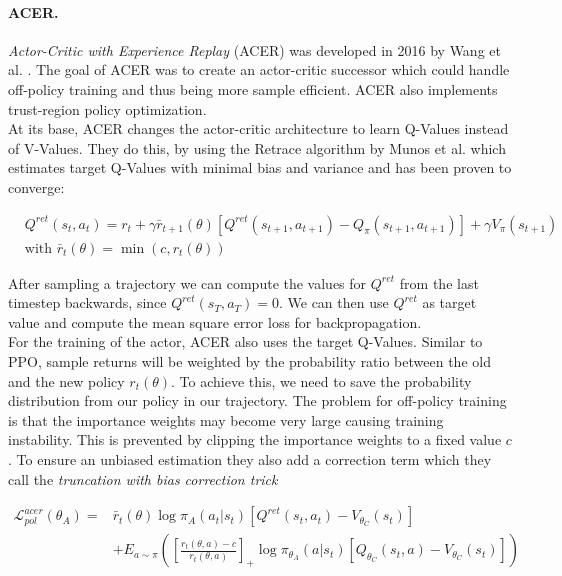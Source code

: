 \paragraph{ACER.}
\textit{Actor-Critic with Experience Replay} (ACER) was developed in 2016 by Wang et al. \cite{wang2016sample}. The goal of ACER was to create an actor-critic successor which could handle off-policy training and thus being more sample efficient. ACER also implements trust-region policy optimization. \\
At its base, ACER changes the actor-critic architecture to learn Q-Values instead of V-Values. They do this, by using the Retrace algorithm by Munos et al. \cite{munos2016safe} which estimates target Q-Values with minimal bias and variance and has been proven to converge:

\begin{align*}
  &Q^{ret}(s_t, a_t) = r_t + \gamma \bar{r}_{t+1}(\theta) \left[Q^{ret}(s_{t+1}, a_{t+1}) - Q_\pi(s_{t+1}, a_{t+1})\right] + \gamma V_\pi(s_{t+1}) \\
  &\text{with } \bar{r}_t(\theta) = \min(c, r_t(\theta))
\end{align*}

After sampling a trajectory we can compute the values for $Q^{ret}$ from the last timestep backwards, since $Q^{ret}(s_T, a_T) = 0$. We can then use $Q^{ret}$ as target value and compute the mean square error loss for backpropagation. \\
For the training of the actor, ACER also uses the target Q-Values. Similar to PPO, sample returns will be weighted by the probability ratio between the old and the new policy $r_t(\theta)$. To achieve this, we need to save the probability distribution from our policy in our trajectory. The problem for off-policy training is that the importance weights may become very large causing training instability. This is prevented by clipping the importance weights to a fixed value $c$. To ensure an unbiased estimation they also add a correction term which they call the \textit{truncation with bias correction trick} 

\begin{align*}
  \mathcal{L}^{acer}_{pol}(\theta_A) = &\bar{r}_t(\theta) \log \pi_A(a_t|s_t)[Q^{ret}(s_t, a_t) - V_{\theta_C}(s_t)] \\ 
  &+ E_{a\sim\pi} \left(\left[\frac{r_t(\theta, a) - c}{r_t(\theta, a)}\right]_{+} \log \pi_{\theta_A}(a|s_t)[Q_{\theta_C}(s_t, a) - V_{\theta_C}(s_t)] \right)
\end{align*}

